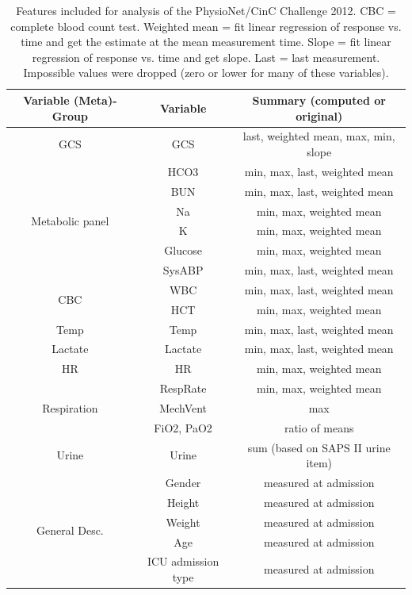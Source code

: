 \documentclass{article}
\begin{document}
\begin{table}
	\begin{center}
\begin{tabular}{c|c|c}
	Variable (Meta)-Group & Variable & Summary (computed or original) \\
	\toprule
	GCS & GCS & last, weighted mean, max, min, slope\\
	\hline
	\multirow{6}{*}{Metabolic panel}  & HCO3 & min, max, last, weighted mean\\
	& BUN & min, max, last, weighted mean\\
	& Na & min, max, weighted mean\\
	& K & min, max, weighted mean\\
	& Glucose & min, max, weighted mean\\
	\hline
	SysABP & SysABP & min, max, last, weighted mean\\
	\hline
	\multirow{2}{*}{CBC} & WBC & min, max, last, weighted mean\\
	& HCT & min, max, weighted mean\\
	\hline
	Temp & Temp & min, max, last, weighted mean\\
	\hline
	Lactate & Lactate & min, max, last, weighted mean \\
	\hline
	HR & HR & min, max, weighted mean\\
	\hline
	\multirow{3}{*}{Respiration} & RespRate & min, max, weighted mean\\
	& MechVent & max \\
	& FiO2, PaO2 & ratio of means\\
	\hline
	Urine & Urine & sum (based on SAPS II urine item)\\
	\hline
	\multirow{5}{*}{General Desc.} & Gender & measured at admission \\
	& Height & measured at admission \\
	& Weight & measured at admission \\
	& Age & measured at admission \\
	& ICU admission type & measured at admission \\
\end{tabular}
	\end{center}
\caption{
Features included for analysis of the PhysioNet/CinC Challenge 2012.
CBC = complete blood count test.
Weighted mean = fit linear regression of response vs. time and get the estimate at the mean measurement time.
Slope = fit linear regression of response vs. time and get slope.
Last = last measurement.
Impossible values were dropped (zero or lower for many of these variables).
}
\label{table:icu_features}
\end{table}
\end{document}
